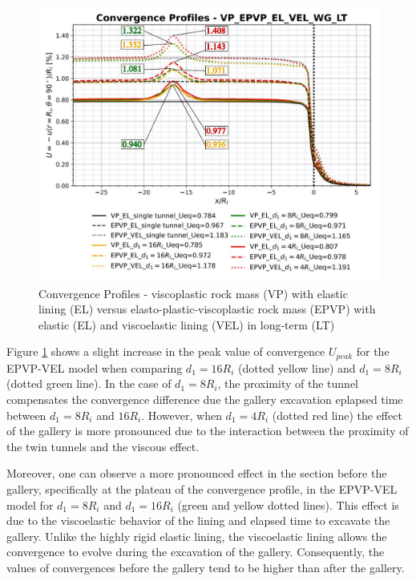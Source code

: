 \documentclass[a4paper,fleqn]{cas-sc}
\begin{document}
\begin{figure}[h!]
	\centering
	\includegraphics[scale=0.6]{Convergence Profiles - VP_EPVP_EL_VEL_WG_LT.pdf}
	\caption{Convergence Profiles - viscoplastic rock mass (VP) with elastic lining (EL) versus elasto-plastic-viscoplastic rock mass (EPVP) with elastic (EL) and viscoelastic lining (VEL) in long-term (LT)}
	\label{VP-EL-EPVP-VEL-WG-LT}
\end{figure}
\FloatBarrier
Figure \ref{VP-EL-EPVP-VEL-WG-LT} shows a slight increase in the peak value of convergence $U_{peak}$ for the EPVP-VEL model when comparing $d_1 = 16R_i$ (dotted yellow line) and $d_1 = 8R_i$ (dotted green line). In the case of $d_1 = 8R_i$, the proximity of the tunnel compensates the convergence difference due the gallery excavation eplapsed time between $d_1 = 8R_i$ and $16 R_i$. However, when $d_1 = 4R_i$ (dotted red line) the effect of the gallery is more pronounced due to the interaction between the proximity of the twin tunnels and the viscous effect. 

Moreover, one can observe a more pronounced effect in the section before the gallery, specifically at the plateau of the convergence profile, in the EPVP-VEL model for $d_1 = 8R_i$ and $d_1 = 16R_i$ (green and yellow dotted lines). This effect is due to the viscoelastic behavior of the lining and elapsed time to excavate the gallery. Unlike the highly rigid elastic lining, the viscoelastic lining allows the convergence to evolve during the excavation of the gallery. Consequently, the values of convergences before the gallery tend to be higher than after the gallery.
\end{document}
